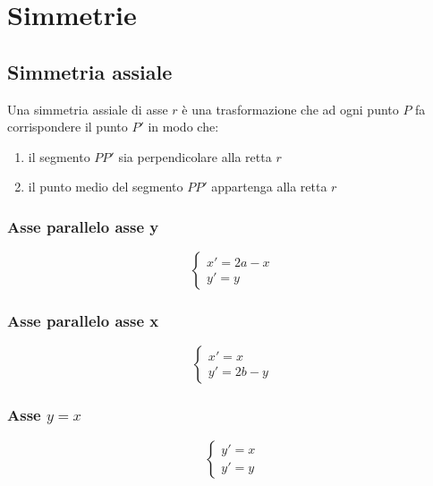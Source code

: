\chapter{Simmetrie}
\section{Simmetria assiale}
Una simmetria assiale di asse $r$ è una trasformazione che ad ogni punto $P$ fa corrispondere il punto $P'$ in modo che:
\begin{enumerate}
	\item il segmento $PP'$ sia perpendicolare alla retta $r$
	\item il punto medio del segmento $PP'$ appartenga alla retta $r$
\end{enumerate}
\subsection{Asse parallelo asse y}
\begin{tcolorbox}[sidebyside,righthand width=7cm,colback=white,colframe=white,fonttitle=\bfseries	]
\[\begin{cases}
x'=2a-x\\
y'=y
\end{cases}
\]
\tcblower
	
\end{tcolorbox}
\subsection{Asse parallelo asse x}
\begin{tcolorbox}[sidebyside,righthand width=7cm,colback=white,colframe=white,fonttitle=\bfseries	]
		\[\begin{cases}
	x'=x\\
	y'=2b-y
	\end{cases}
	\]
	\tcblower
	
\end{tcolorbox}
\subsection{Asse $y=x$}
\begin{tcolorbox}[sidebyside,righthand width=7cm,colback=white,colframe=white,fonttitle=\bfseries	]
	\[\begin{cases}
	y'=x\\
	y'=y
	\end{cases}
	\]
\tcblower
		
\end{tcolorbox}
